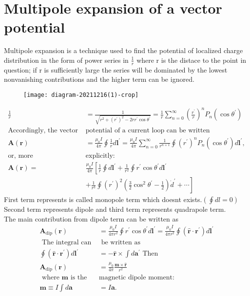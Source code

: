 \section{Multipole expansion of a vector potential}
Multipole expansion is a technique used to find the potential of localized charge distribution in the form of power series in $\frac{1}{r}$ where r is the distace to the point in question; if r is sufficiently large the series will be dominated by the lowest nonvanishing contributions and the higher term can be ignored.\\
\begin{figure}[H]
	\centering
	\texttt{[image: diagram-20211216(1)-crop]}
	\caption{}
	\label{}
\end{figure}
\begin{align*}
\frac{1}{r}&=\frac{1}{\sqrt{r^{2}+\left(r^{\prime}\right)^{2}-2 r r^{\prime} \cos \theta^{\prime}}}=\frac{1}{r} \sum_{n=0}^{\infty}\left(\frac{r^{\prime}}{r}\right)^{n} P_{n}\left(\cos \theta^{\prime}\right)\\
\text{Accordingly, the vector }&\text{potential of a current loop can be written}\\
\mathbf{A}(\mathbf{r})&=\frac{\mu_{0} I}{4 \pi} \oint \frac{1}{r} d \mathbf{l}^{\prime}=\frac{\mu_{0} I}{4 \pi} \sum_{n=0}^{\infty} \frac{1}{r^{n+1}} \oint\left(r^{\prime}\right)^{n} P_{n}\left(\cos \theta^{\prime}\right) d \mathbf{l}^{\prime},\\
\text{or, more }&\text{explicitly:}\\
\mathbf{A}(\mathbf{r})=& \frac{\mu_{0} I}{4 \pi}\left[\frac{1}{r} \oint d \mathbf{l}^{\prime}+\frac{1}{r^{2}} \oint r^{\prime} \cos \theta^{\prime} d \mathbf{l}^{\prime}\right.\\
&\left.+\frac{1}{r^{3}} \oint\left(r^{\prime}\right)^{2}\left(\frac{3}{2} \cos ^{2} \theta^{\prime}-\frac{1}{2}\right) \dot{d}^{\prime}+\cdots\right]
\end{align*}
 First term represents is called monopole term which doesnt exists.$\left( \oint dl=0\right) $\\
 Second term represents dipole and third term represents quadrapole term.\\
 The main contribution from dipole term can be written as 
 \begin{align*}
 \mathbf{A}_{\mathrm{dip}}(\mathbf{r})&=\frac{\mu_{0} I}{4 \pi r^{2}} \oint r^{\prime} \cos \theta^{\prime} d \mathbf{l}^{\prime}=\frac{\mu_{0} I}{4 \pi r^{2}} \oint\left(\hat{\mathbf{r}} \cdot \mathbf{r}^{\prime}\right) d \mathbf{l}^{\prime}\\
\text{ The integral can }&\text{ be written as}\\
 \oint\left(\hat{\mathbf{r}} \cdot \mathbf{r}^{\prime}\right) d \mathbf{l}^{\prime}&=-\hat{\mathbf{r}} \times \int d \mathbf{a}^{\prime}
\text{ Then }\\
 \mathbf{A}_{\mathrm{dip}}(\mathbf{r})&=\frac{\mu_{0}}{4 \pi} \frac{\mathbf{m} \times \hat{\mathbf{r}}}{r^{2}}\\
\text{ where $\mathbf{m}$ is the }&\text{magnetic dipole moment:}\\
 \mathbf{m} \equiv I \int d \mathbf{a}&=I \mathbf{a} .
 \end{align*}
